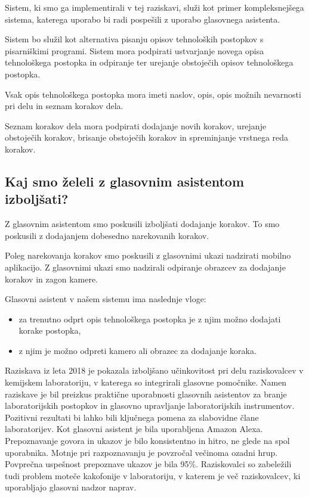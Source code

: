 \documentclass[a4paper, 12pt]{book}
\begin{document}
Sistem, ki smo ga implementirali v tej raziskavi, služi kot primer kompleksnejšega sistema, katerega uporabo bi radi pospešili z uporabo glasovnega asistenta.

Sistem bo služil kot alternativa pisanju opisov tehnoloških postopkov s pisarniškimi programi.
Sistem mora podpirati ustvarjanje novega opisa tehnološkega postopka in odpiranje ter urejanje obstoječih opisov tehnološkega postopka.

Vsak opis tehnološkega postopka mora imeti naslov, opis, opis možnih nevarnosti pri delu in seznam korakov dela.

Seznam korakov dela mora podpirati dodajanje novih korakov, urejanje obstoječih korakov, brisanje obstoječih korakov in spreminjanje vrstnega reda korakov.

\subsection{Kaj smo želeli z glasovnim asistentom izboljšati?}

Z glasovnim asistentom smo poskusili izboljšati dodajanje korakov.
To smo poskusili z dodajanjem dobesedno narekovanih korakov.

Poleg narekovanja korakov smo poskusili z glasovnimi ukazi nadzirati mobilno aplikacijo.
Z glasovnimi ukazi smo nadzirali odpiranje obrazcev za dodajanje korakov in zagon kamere.

\bigbreak 
Glasovni asistent v našem sistemu ima naslednje vloge:
\begin{itemize}
	\item za trenutno odprt opis tehnološkega postopka je z njim možno dodajati korake postopka,
	\item z njim je možno odpreti kamero ali obrazec za dodajanje koraka.
\end{itemize}

Raziskava iz leta 2018 \cite{austerjost2018introducing} je pokazala izboljšano učinkovitost pri delu raziskovalcev v kemijskem laboratoriju, v katerega so integrirali glasovne pomočnike.
Namen raziskave je bil preizkus praktične uporabnosti glasovnih asistentov za branje laboratorijskih postopkov in glasovno upravljanje laboratorijskih instrumentov.
Pozitivni rezultati bi lahko bili ključnega pomena za slabovidne člane laboratorijev.
Kot glasovni asistent je bila uporabljena Amazon Alexa.
Prepoznavanje govora in ukazov je bilo konsistentno in hitro, ne glede na spol uporabnika.
Motnje pri razpoznavanju je povzročal večinoma ozadni hrup.
Povprečna uspešnost prepoznave ukazov je bila 95\%.
Raziskovalci so zabeležili tudi problem moteče kakofonije v laboratoriju, v katerem je več raziskovalcev, ki uporabljajo glasovni nadzor naprav.
\end{document}
